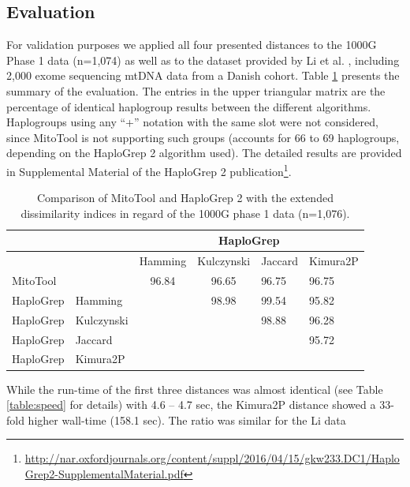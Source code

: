 \subsection{Evaluation}
\label{subs:evaluation}

For validation purposes we applied all four presented distances to the 1000G Phase 1 data (n=1,074) as well as to the dataset provided by Li et al. \cite{Li2014}, including 2,000 exome sequencing mtDNA data from a Danish cohort. Table \ref{table:distances} presents the summary of the evaluation. The entries in the upper triangular matrix are the percentage of identical haplogroup results between the different algorithms. Haplogroups using any “+” notation with the same slot were not considered, since MitoTool is not supporting such groups (accounts for 66 to 69 haplogroups, depending on the HaploGrep 2 algorithm used). The detailed results are provided in Supplemental Material of the HaploGrep 2 publication\footnote{\url{http://nar.oxfordjournals.org/content/suppl/2016/04/15/gkw233.DC1/HaploGrep2-SupplementalMaterial.pdf}}. 
\begin{table}[H]
\centering
\begin{tabular}{l|l|llll}
\cline{3-6}
 &    & \multicolumn{4}{c|}{HaploGrep} \\ \hline
\cellcolor[HTML]{FFFFFF} & \cellcolor[HTML]{FFFFFF} & \cellcolor[HTML]{FFFFFF}Hamming & Kulczynski & Jaccard & Kimura2P \\
MitoTool & & \multicolumn{1}{c}{\cellcolor[HTML]{96FFFB}96.84} & \multicolumn{1}{c}{\cellcolor[HTML]{96FFFB}96.65} & 
\cellcolor[HTML]{96FFFB}96.75 & \cellcolor[HTML]{96FFFB}96.75 \\ \hline
HaploGrep & Hamming & \multicolumn{1}{c}{\cellcolor[HTML]{FFFFFF}{\color[HTML]{330001} }} & \multicolumn{1}{c}{\cellcolor[HTML]{A9D0FF}98.98} & \cellcolor[HTML]{34CDF9}99.54 & \cellcolor[HTML]{ECF4FF}95.82 \\
HaploGrep  & Kulczynski & & \cellcolor[HTML]{FFFFFF} & \cellcolor[HTML]{A9D0FF}98.88 & \cellcolor[HTML]{96FFFB}96.28 \\
HaploGrep & Jaccard & & & & \cellcolor[HTML]{ECF4FF}95.72 \\
HaploGrep & Kimura2P & & & & \cellcolor[HTML]{FFFFFF} \\
\end{tabular}
\caption{Comparison of MitoTool and HaploGrep 2 with the extended dissimilarity indices in regard of the 1000G phase 1 data (n=1,076).}
\label{table:distances}
\end{table}
While the run-time of the first three distances was almost identical (see Table \ref{table:speed} for details) with 4.6 – 4.7 sec, the Kimura2P distance showed a 33-fold higher wall-time (158.1 sec). The ratio was similar for the Li data
